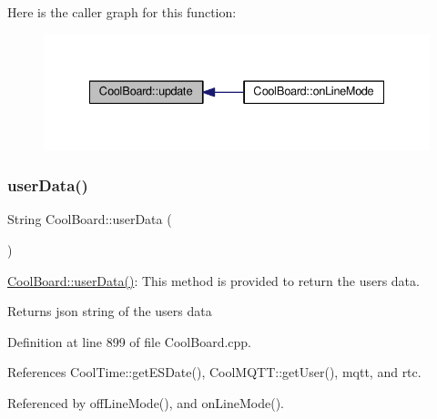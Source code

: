 Here is the caller graph for this function\+:
\nopagebreak
\begin{figure}[H]
\begin{center}
\leavevmode
\includegraphics[width=335pt]{classCoolBoard_a8612756d3f73198cdde857a66f0fe690_icgraph}
\end{center}
\end{figure}
\mbox{\label{classCoolBoard_ae7358fb6e623cfc81b775f5f1734909b}} 
\subsubsection{\texorpdfstring{user\+Data()}{userData()}}
{\footnotesize\ttfamily String Cool\+Board\+::user\+Data (\begin{DoxyParamCaption}{ }\end{DoxyParamCaption})}

\hyperlink{classCoolBoard_ae7358fb6e623cfc81b775f5f1734909b}{Cool\+Board\+::user\+Data()}\+: This method is provided to return the user\textquotesingle{}s data.

\begin{DoxyReturn}{Returns}
json string of the user\textquotesingle{}s data 
\end{DoxyReturn}


Definition at line 899 of file Cool\+Board.\+cpp.



References Cool\+Time\+::get\+E\+S\+Date(), Cool\+M\+Q\+T\+T\+::get\+User(), mqtt, and rtc.



Referenced by off\+Line\+Mode(), and on\+Line\+Mode().


